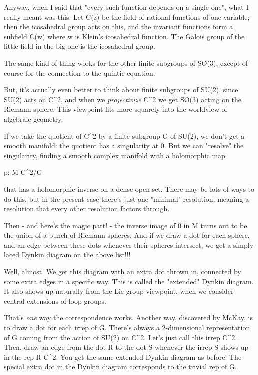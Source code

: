 Anyway, when I said that "every such function depends 
on a single one",
what I really meant was this.  Let C(z) be the field of rational functions
of one variable; then the icosahedral group acts on this,
and the invariant functions form a subfield C(w) where w is Klein's
icosahedral function.  The Galois group of the little field in the big
one is the icosahedral group.

The same kind of thing works for the other finite subgroups of SO(3),
except of course for the connection to the quintic equation.

But, it's actually even better to think about finite subgroups of 
SU(2), since SU(2) acts on C^{2}, and when we \emph{projectivize} C^{2} we
get SO(3) acting on the Riemann sphere.  This viewpoint fits more 
squarely into the worldview of algebraic geometry.

If we take the quotient of C^{2} by a finite subgroup G of SU(2), we 
don't get a smooth manifold: the quotient has a singularity at 0.
But we can "resolve" the singularity, finding a smooth complex manifold
with a holomorphic map

p: M \to  C^{2}/G

that has a holomorphic inverse on a dense open set.  There may be 
lots of ways to do this, but in the present case there's just one 
"minimal" resolution, meaning a resolution that every other resolution
factors through.

Then - and here's the magic part! - the inverse image of 0 in M 
turns out to be the union of a bunch of Riemann spheres.  And
if we draw a dot for each sphere, and an edge between these dots 
whenever their spheres intersect, we get a simply laced Dynkin 
diagram on the above list!!!

Well, almost.  We get this diagram with an extra dot thrown in,
connected by some extra edges in a specific way.  This is called 
the "extended" Dynkin diagram.  It also shows up naturally from 
the Lie group viewpoint, when we consider central extensions of 
loop groups.  

That's \emph{one} way the correspondence works.  Another way, discovered
by McKay, is to draw a dot for each irrep of G.  There's always a
2-dimensional representation of G coming from the action of SU(2) 
on C^{2}.  Let's just call this irrep C^{2}.  
Then, draw an edge
from the dot R to the dot S whenever the irrep S shows up 
in the rep R \otimes  C^{2}.
You get the same extended Dynkin diagram as before!
The special extra dot in the Dynkin diagram corresponds to the 
trivial rep of G.

